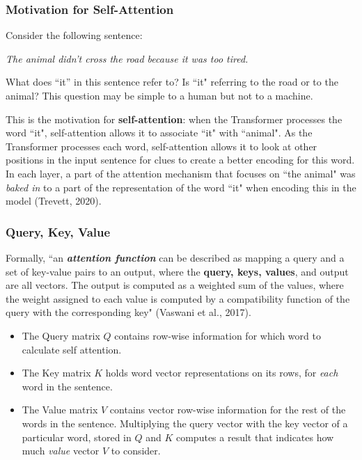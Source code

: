 \subsubsection{Motivation for Self-Attention}

Consider the following sentence: 


\begin{shadequote}{}
\vspace{10pt}
\Large \textit{The animal didn't cross the road because it was too tired.}
\vspace{10pt}
\end{shadequote}

What does ``it” in this sentence refer to? Is ``it" referring to the road or to the animal? This question may be simple to a human but not to a machine. \newline

This is the motivation for \textbf{self-attention}: when the Transformer processes the word ``it", self-attention allows it to associate ``it" with ``animal". As the Transformer processes each word, self-attention allows it to look at other positions in the input sentence for clues to create a better encoding for this word. In each layer, a part of the attention mechanism that focuses on ``the animal" was \emph{baked in} to a part of the representation of the word ``it" when encoding this in the model (Trevett, 2020). 


\subsubsection{Query, Key, Value}

Formally, ``an \textbf{\textit{attention function}} can be described as mapping a query and a set of key-value pairs to an output, where the \textbf{query, keys, values}, and output are all vectors. The output is computed as a weighted sum of the values, where the weight assigned to each value is computed by a compatibility function of the query with the corresponding key" (Vaswani et al., 2017). 

\begin{itemize}
    \item The Query matrix $Q$ contains row-wise information for which word to calculate self attention. 
    
     \item The Key matrix $K$ holds word vector representations on its rows, for \emph{each} word in the sentence.
     
    \item The Value matrix $V$ contains vector row-wise information for the rest of the words in the sentence. Multiplying the query vector with the key vector of a particular word, stored in $Q$ and $K$ computes a result that indicates how much \emph{value} vector $V$ to consider.
\end{itemize}

